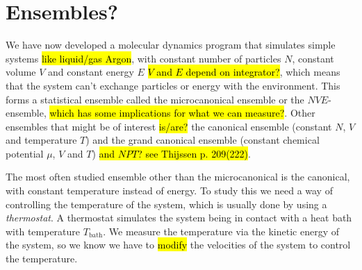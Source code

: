 \chapter{Ensembles?}

We have now developed a molecular dynamics program that simulates simple systems \hl{like liquid/gas Argon}, with constant number of particles $N$, constant volume $V$ and constant energy $E$ \hl{$V$ and $E$ depend on integrator?}, which means that the system can't exchange particles or energy with the environment. This forms a statistical ensemble called the microcanonical ensemble or the $NVE$-ensemble, \hl{which has some implications for what we can measure?}. Other ensembles that might be of interest \hl{is/are?} the canonical ensemble (constant $N$, $V$ and temperature $T$) and the grand canonical ensemble (constant chemical potential $\mu$, $V$ and $T$) \hl{and $NPT$? see Thijssen p. 209(222)}.


The most often studied ensemble other than the microcanonical is the canonical, with constant temperature instead of energy. To study this we need a way of controlling the temperature of the system, which is usually done by using a \emph{thermostat}. A thermostat simulates the system being in contact with a heat bath with temperature $T_\text{bath}$.  We measure the temperature via the kinetic energy of the system, so we know we have to \hl{modify} the velocities of the system to control the temperature. 


